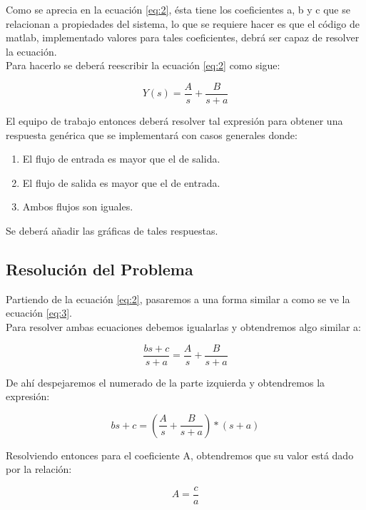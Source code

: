 \documentclass[12pt]{article}
\begin{document}
Como se aprecia en la ecuación \eqref{eq:2}, ésta tiene los coeficientes a, b y c que se relacionan a propiedades del sistema, lo que se requiere hacer es que el código de matlab, implementado valores para tales coeficientes, debrá ser capaz de resolver la ecuación.\\

Para hacerlo se deberá reescribir la ecuación \eqref{eq:2} como sigue:

\begin{equation}
Y(s)=\frac{A}{s}+\frac{B}{s+a} \label{eq:3}
\end{equation}

El equipo de trabajo entonces deberá resolver tal expresión para obtener una respuesta genérica que se implementará con casos generales donde:

\begin{enumerate}
\item El flujo de entrada es mayor que el de salida.
\item El flujo de salida es mayor que el de entrada.
\item Ambos flujos son iguales.
\end{enumerate}

Se deberá añadir las gráficas de tales respuestas.

\subsection{Resolución del Problema}

Partiendo de la ecuación \eqref{eq:2}, pasaremos a una forma similar a como se ve la ecuación \eqref{eq:3}.\\

Para resolver ambas ecuaciones debemos igualarlas y obtendremos algo similar a:

\begin{equation}
	\frac{bs+c}{s+a} = \frac{A}{s}+\frac{B}{s+a}
\end{equation}

De ahí despejaremos el numerado de la parte izquierda y obtendremos la expresión:

\begin{equation}
	bs + c = \left(\frac{A}{s}+\frac{B}{s+a}\right) * (s+a)
\end{equation}

Resolviendo entonces para el coeficiente A, obtendremos que su valor está dado por la relación:

\begin{equation}
	A = \frac{c}{a}
\end{equation}
\end{document}
